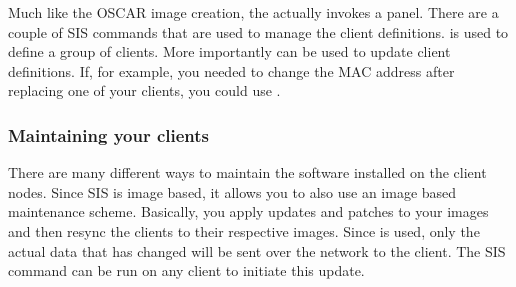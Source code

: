 Much like the OSCAR image creation, the  actually
invokes a  panel. There are a couple of SIS commands that are used 
to manage the client definitions.  is used to define a group of
clients. More importantly  can be used to update client 
definitions. If, for example, you needed to change the MAC address after replacing
one of your clients, you could use .

\subsubsection{Maintaining your clients}

There are many different ways to maintain the software installed on the client
nodes. Since SIS is image based, it allows you to also use an image based 
maintenance scheme. Basically, you apply updates and patches to your images 
and then resync the clients to their respective images. Since  is
used, only the actual data that has changed will be sent over the network to 
the client. The SIS command  can be run on any client to
initiate this update.

